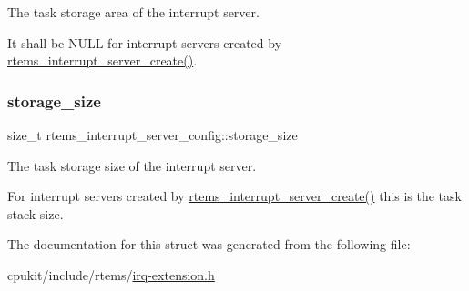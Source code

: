 The task storage area of the interrupt server. 

It shall be N\+U\+LL for interrupt servers created by \mbox{\hyperlink{group__rtems__interrupt__extension_gad7725dd729bfd34f36c0de4d9c326abc}{rtems\+\_\+interrupt\+\_\+server\+\_\+create()}}. \mbox{\label{structrtems__interrupt__server__config_a0c0a50c42b73f1582d43b941e2cf1168}} 
\subsubsection{\texorpdfstring{storage\_size}{storage\_size}}
{\footnotesize\ttfamily size\+\_\+t rtems\+\_\+interrupt\+\_\+server\+\_\+config\+::storage\+\_\+size}



The task storage size of the interrupt server. 

For interrupt servers created by \mbox{\hyperlink{group__rtems__interrupt__extension_gad7725dd729bfd34f36c0de4d9c326abc}{rtems\+\_\+interrupt\+\_\+server\+\_\+create()}} this is the task stack size. 

The documentation for this struct was generated from the following file\+:\begin{DoxyCompactItemize}
\item 
cpukit/include/rtems/\mbox{\hyperlink{irq-extension_8h}{irq-\/extension.\+h}}\end{DoxyCompactItemize}
